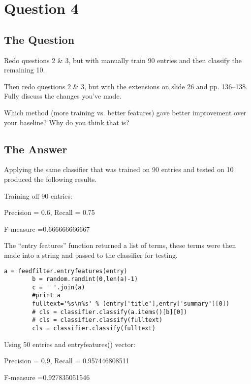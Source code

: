 \section{Question 4}

\subsection{The Question}

\begin{flushleft}

Redo questions 2 \& 3, but with manually train 90 entries and 
then classify the remaining 10.

Then redo questions 2 \& 3, but with the extensions on slide 26
and pp. 136--138.  Fully discuss the changes you've made.

Which method (more training vs. better features) gave better improvement
over your baseline?  Why do you think that is?

\end{flushleft}

\subsection{The Answer}

Applying the same classifier that was trained on 90 entries and tested on 10 produced the following results.

Training off 90 entries:
\begin{center}
Precision = 0.6, Recall =  0.75

F-measure =0.666666666667
\end{center}

The ``entry features'' function returned a list of terms, these terms were then made into a string and passed to the classifier for testing. 

\begin{lstlisting}[caption=Python code using entry features]
a = feedfilter.entryfeatures(entry)
	    b = random.randint(0,len(a)-1)
	    c = ' '.join(a)
	    #print a
	    fulltext='%s\n%s' % (entry['title'],entry['summary'][0])
	    # cls = classifier.classify(a.items()[b][0])
	    # cls = classifier.classify(fulltext)
	    cls = classifier.classify(fulltext)
\end{lstlisting}




Using 50 entries and entryfeatures() vector:
\begin{center}
Precision = 0.9, Recall =  0.957446808511

F-measure =0.927835051546
\end{center}


